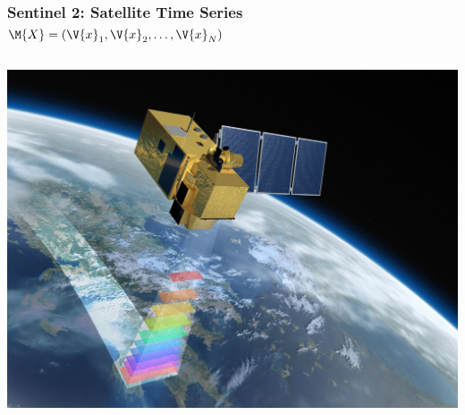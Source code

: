 \documentclass[%
  aspectratio=169,
  9pt,
  USenglish,
  titlegraphic, %
  affiliationintitlepagehead,
  affiliation,
]{beamer}
\begin{document}
\begin{frame}
\frametitle{Sentinel 2: Satellite Time Series $\M{X} = (\V{x}_1,\V{x}_2,\dots,\V{x}_N)$}

\begin{columns}
	
	
	
	\includegraphics[width=\textwidth]{images/sentinel2}
	
	
	
	

\end{columns}
\end{frame}
\end{document}
